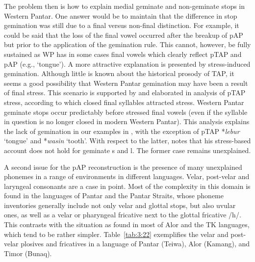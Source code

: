 \newpage 
The problem then is how to explain medial geminate and non-geminate stops in Western Pantar. One answer would be to maintain that the difference in stop gemination was still due to a final versus non-final distinction. For example, it could be said that the loss of the final vowel occurred after the breakup of pAP but prior to the application of the gemination rule. This cannot, however, be fully sustained as WP has in some cases final vowels which clearly reflect pTAP and pAP (e.g., `tongue'). A more attractive explanation is presented by stress-induced gemination. Although little is known about the historical prosody of TAP, it seems a good possibility that Western Pantar gemination may have been a result of final stress. 
This scenario is supported by and elaborated in  analysis of pTAP stress, according to which closed final syllables attracted stress. Western Pantar geminate stops occur predictably before stressed final vowels (even if the syllable in question is no longer closed in modern Western Pantar). This analysis explains the lack of gemination in our examples in , with the exception of pTAP *\textit{lebur} `tongue' and *\textit{wasin} `tooth'. With respect to the latter, \citet[288]{Heston2016} notes that his stress-based account does not hold for geminate s and l. The former case remains unexplained.

A second issue for the pAP reconstruction is the presence of many unexplained phonemes in a range of environments in different languages. Velar, post-velar and laryngeal consonants are a case in point. Most of the complexity in this domain is found in the languages of Pantar and the Pantar Straits, whose phoneme inventories generally include not only velar and glottal stops, but also uvular ones, as well as a velar or pharyngeal fricative next to the glottal fricative /h/. This contrasts with the situation as found in most of Alor and the TK languages, which tend to be rather simpler. Table~\ref{tab:3:22} exemplifies the velar and post-velar plosives and fricatives in a language of Pantar (Teiwa), Alor (Kamang), and Timor (Bunaq).



